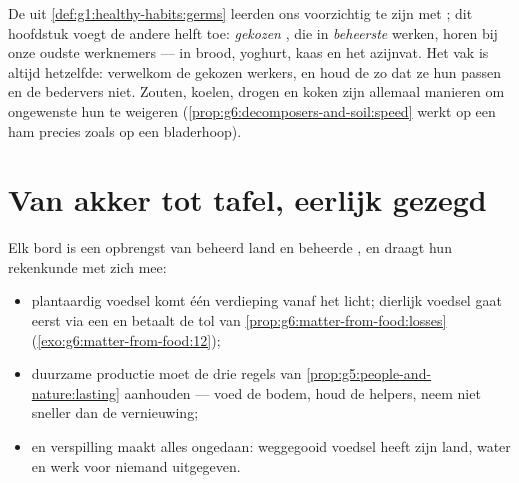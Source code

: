 \begin{remark}\label{rem:g6:producing-our-food:goodbad}
De  uit \cref{def:g1:healthy-habits:germs} leerden ons
voorzichtig te zijn met ; dit hoofdstuk voegt de andere helft
toe: \emph{gekozen} , die in \emph{beheerste} 
werken, horen bij onze oudste werknemers --- in brood, yoghurt, kaas en
het azijnvat. Het vak is altijd hetzelfde: verwelkom de gekozen werkers,
en houd de  zo dat ze hun passen en de bedervers niet.
Zouten, koelen, drogen en koken zijn allemaal manieren om ongewenste
 hun  te weigeren
(\cref{prop:g6:decomposers-and-soil:speed} werkt op een ham precies zoals
op een bladerhoop).
\end{remark}

\section{Van akker tot tafel, eerlijk gezegd}

\begin{proposition}\label{prop:g6:producing-our-food:costs}
Elk bord is een opbrengst van beheerd land en beheerde , en
draagt hun rekenkunde met zich mee:
\begin{itemize}
  \item plantaardig voedsel komt één verdieping vanaf het licht;
        dierlijk voedsel gaat eerst via een  en betaalt de tol
        van \cref{prop:g6:matter-from-food:losses}
        (\cref{exo:g6:matter-from-food:12});
  \item duurzame productie moet de drie regels van
        \cref{prop:g5:people-and-nature:lasting} aanhouden --- voed de
        bodem, houd de helpers, neem niet sneller dan de vernieuwing;
  \item en verspilling maakt alles ongedaan: weggegooid voedsel heeft
        zijn land, water en werk voor niemand uitgegeven.
\end{itemize}
\end{proposition}
\admitted

